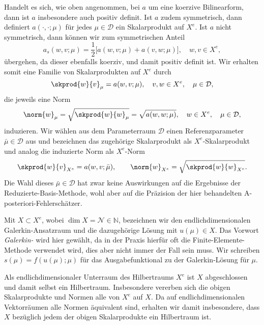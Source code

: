 Handelt es sich, wie oben angenommen, bei $a$ um eine koerzive Bilinearform, dann ist $a$ insbesondere auch positiv definit.
Ist $a$ zudem symmetrisch, dann definiert $a(\cdot, \cdot; \mu)$ für jedes $\mu \in \mathcal D$ ein Skalarprodukt auf $X^e$.
Ist $a$ nicht symmetrisch, dann können wir zum symmetrischen Anteil
\begin{equation}
    a_s(w, v; \mu) = \frac{1}{2} \Big[ a(w, v; \mu) + a(v, w; \mu) \Big], \quad w, v \in X^e,
\end{equation}
übergehen, da dieser ebenfalls koerziv, und damit positiv definit ist.
Wir erhalten somit eine Familie von Skalarprodukten auf $X^e$ durch
\begin{equation}
    \skprod{w}{v}_{\mu} = a(w, v; \mu), \quad v, w \in X^e, \quad \mu \in \mathcal D,
\end{equation}
die jeweils eine Norm
\begin{equation}
    \norm{w}_{\mu} = \sqrt{\skprod{w}{w}_{\mu}} = \sqrt{a(w, w; \mu)}, \quad w \in X^e, \quad \mu \in \mathcal D,
\end{equation}
induzieren.
Wir wählen aus dem Parameterraum $\mathcal D$ einen Referenzparameter $\bar \mu \in \mathcal D$ aus und bezeichnen das zugehörige Skalarprodukt als $X^e$-Skalarprodukt und analog die induzierte Norm als $X^e$-Norm
\begin{equation}
    \skprod{w}{v}_{X^e} = a(w, v; \bar \mu),
    \qquad
    \norm{w}_{X^e} = \sqrt{\skprod{w}{w}_{X^e}}.
\end{equation}
Die Wahl dieses $\bar \mu \in \mathcal D$ hat zwar keine Auswirkungen auf die Ergebnisse der Reduzierte-Basis-Methode, wohl aber auf die Präzision der hier behandelten A-posteriori-Fehlerschätzer.

Mit $X \subset X^e$, wobei $\dim X = \mathcal N \in \mathbb{N}$, bezeichnen wir den endlichdimensionalen Galerkin-Ansatzraum und die dazugehörige Lösung mit $u(\mu) \in X$.
Das Vorwort \emph{Galerkin-} wird hier gewählt, da in der Praxis hierfür oft die Finite-Elemente-Methode verwendet wird, dies aber nicht immer der Fall sein muss.
Wir schreiben $s(\mu) = f(u(\mu); \mu)$ für das Ausgabefunktional zu der Galerkin-Lösung für $\mu$.

Als endlichdimensionaler Unterraum des Hilbertraums $X^e$ ist $X$ abgeschlossen und damit selbst ein Hilbertraum.
Insbesondere vererben sich die obigen Skalarprodukte und Normen alle von $X^e$ auf $X$.
Da auf endlichdimensionalen Vektorräumen alle Normen äquivalent sind, erhalten wir damit insbesondere, dass $X$ bezüglich jedem der obigen Skalarprodukte ein Hilbertraum ist.

